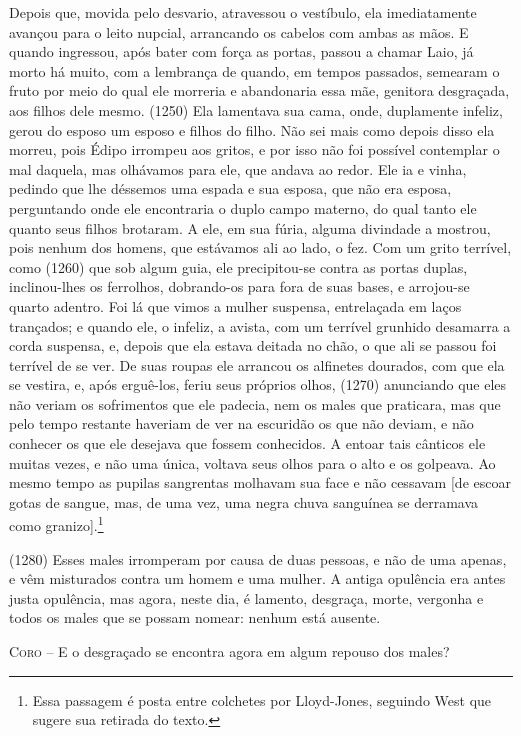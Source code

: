 Depois que, movida pelo desvario, atravessou o vestíbulo, ela
imediatamente avançou para o leito nupcial, arrancando os cabelos com
ambas as mãos. E quando ingressou, após bater com força as portas,
passou a chamar Laio, já morto há muito, com a lembrança de quando, em
tempos passados, semearam o fruto por meio do qual ele morreria e
abandonaria essa mãe, genitora desgraçada, aos filhos dele mesmo. (1250)
Ela lamentava sua cama, onde, duplamente infeliz, gerou do esposo um
esposo e filhos do filho. Não sei mais como depois disso ela morreu,
pois Édipo irrompeu aos gritos, e por isso não foi possível contemplar o
mal daquela, mas olhávamos para ele, que andava ao redor. Ele ia e
vinha, pedindo que lhe déssemos uma espada e sua esposa, que não era
esposa, perguntando onde ele encontraria o duplo campo materno, do qual
tanto ele quanto seus filhos brotaram. A ele, em sua fúria, alguma
divindade a mostrou, pois nenhum dos homens, que estávamos ali ao lado,
o fez. Com um grito terrível, como (1260) que sob algum guia, ele
precipitou-se contra as portas duplas, inclinou-lhes os ferrolhos,
dobrando-os para fora de suas bases, e arrojou-se quarto adentro. Foi lá
que vimos a mulher suspensa, entrelaçada em laços trançados; e quando
ele, o infeliz, a avista, com um terrível grunhido desamarra a corda
suspensa, e, depois que ela estava deitada no chão, o que ali se passou
foi terrível de se ver. De suas roupas ele arrancou os alfinetes
dourados, com que ela se vestira, e, após erguê-los, feriu seus próprios
olhos, (1270) anunciando que eles não veriam os sofrimentos que ele
padecia, nem os males que praticara, mas que pelo tempo restante
haveriam de ver na escuridão os que não deviam, e não conhecer os que
ele desejava que fossem conhecidos. A entoar tais cânticos ele muitas
vezes, e não uma única, voltava seus olhos para o alto e os golpeava. Ao
mesmo tempo as pupilas sangrentas molhavam sua face e não cessavam {[}de
escoar gotas de sangue, mas, de uma vez, uma negra chuva sanguínea se
derramava como granizo{]}.\footnote{Essa passagem é posta entre colchetes
  por Lloyd-Jones, seguindo West que sugere sua retirada do texto.}

(1280) Esses males irromperam por causa de duas pessoas, e não de uma
apenas, e vêm misturados contra um homem e uma mulher. A antiga
opulência era antes justa opulência, mas agora, neste dia, é lamento,
desgraça, morte, vergonha e todos os males que se possam nomear: nenhum
está ausente.

\textsc{Coro} --   E o desgraçado se encontra agora em algum repouso dos males?

